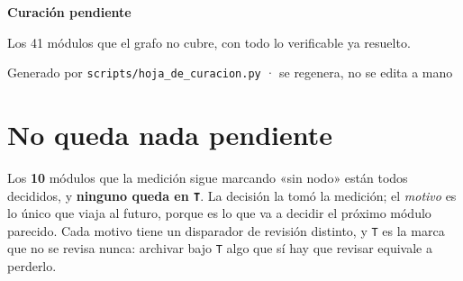 \documentclass[10pt,a4paper]{article}
\begin{document}
\begin{center}
{\LARGE\bfseries\color{acento} Curación pendiente}\par\smallskip
{\color{suave}\small Los 41 módulos que el grafo no cubre, con todo lo
verificable ya resuelto.}\par
{\color{suave}\footnotesize Generado por \texttt{scripts/hoja\_de\_curacion.py}
· se regenera, no se edita a mano}
\end{center}
\vspace{4pt}

\section*{No queda nada pendiente}

Los \textbf{10} módulos que la medición
sigue marcando «sin nodo» están todos decididos, y \textbf{ninguno queda en
\texttt{T}}. La decisión la tomó la medición; el \emph{motivo} es lo único que
viaja al futuro, porque es lo que va a decidir el próximo módulo parecido.
Cada motivo tiene un disparador de revisión distinto, y \texttt{T} es la marca
que no se revisa nunca: archivar bajo \texttt{T} algo que sí hay que revisar
equivale a perderlo.\par\medskip
\end{document}
